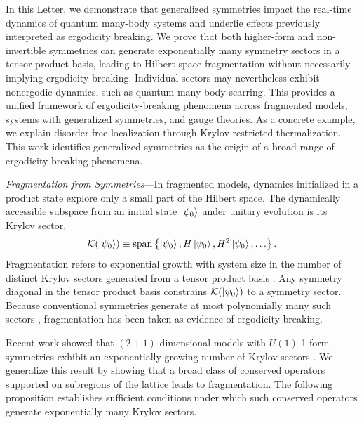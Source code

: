 \documentclass[
 reprint,
 amsmath,amssymb,
 aps,floatfix,prl,superscriptaddress
]{revtex4-2}
\newcounter{paranum}
\renewcommand{\theparanum}{\Roman{paranum}} %
\newcommand{\pnum}[1]{%
  \textit{#1}---}
\begin{document}
In this Letter, we demonstrate that generalized symmetries impact the real-time dynamics of quantum many-body systems %
and underlie effects previously interpreted as ergodicity breaking. We prove that both higher-form and non-invertible symmetries can generate exponentially many symmetry sectors in a tensor product basis, leading to Hilbert space fragmentation without necessarily implying ergodicity breaking. 
Individual sectors may nevertheless exhibit nonergodic dynamics, such as quantum many-body scarring.
This provides a unified framework of ergodicity-breaking phenomena across fragmented models, systems with generalized symmetries, and gauge theories. As a concrete example, we explain disorder free localization \cite{Smith_2017, Gyawali:2024hrz, Halimeh:2025vvp,Karpov:2020nhy,Halimeh:2021nep,Li:2021lay,Papaefstathiou:2020rvv} through Krylov-restricted thermalization. This work identifies generalized symmetries as the origin of a broad range of ergodicity-breaking phenomena. 

\pnum{Fragmentation from Symmetries}In fragmented models, dynamics initialized in a product state explore only a small part of the Hilbert space.
The dynamically accessible subspace from an initial state $\ket{\psi_0}$ under unitary evolution is its Krylov sector,
\begin{equation}
    \mathcal{K}(\ket{\psi_0})
    \equiv \mathrm{span} \left\{ \ket{\psi_0}, H \ket{\psi_0}, H^2 \ket{\psi_0}, \ldots \right\}.
\end{equation}
Fragmentation refers to exponential growth with system size in the number of distinct Krylov sectors generated from a tensor product basis \cite{moudgalya_quantum_2021,Sala_2020,Moudgalya_2022}. Any symmetry diagonal in the tensor product basis constrains $\mathcal{K}(\ket{\psi_0})$ to a symmetry sector. Because conventional symmetries generate at most polynomially many such sectors \cite{moudgalya_quantum_2021}, fragmentation has been taken as evidence of ergodicity breaking.

Recent work showed that $(2+1)$-dimensional models with $U(1)$ 1-form symmetries exhibit an exponentially growing number of Krylov sectors \cite{sohal2025}. We generalize this result by showing that a broad class of conserved operators supported on subregions of the lattice leads to fragmentation. The following proposition establishes sufficient conditions under which such conserved operators generate exponentially many Krylov sectors.
\end{document}
